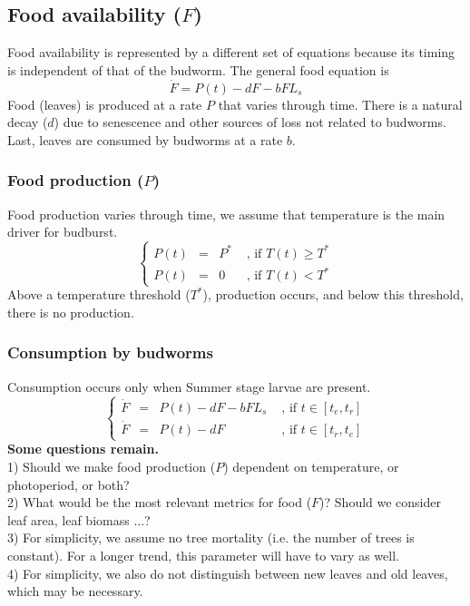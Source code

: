 \documentclass[12 pt]{article}
\begin{document}
\subsection{Food availability ($F$)}
Food availability is represented by a different set of equations because its timing is independent of that of the budworm. The general food equation is
\begin{equation}
   \Dot{F} = P(t) - dF - bFL_s
\end{equation}
Food (leaves) is produced at a rate $P$ that varies through time. There is a natural decay ($d$) due to senescence and other sources of loss not related to budworms. Last, leaves are consumed by budworms at a rate $b$. 
\subsubsection{Food production ($P$)}
Food production varies through time, we assume that temperature is the main driver for budburst.
\begin{equation}
    \left \lbrace
    \begin{array}{lcll}
        P(t) & = & P^* & \text{ , if } T(t) \geqslant T^*  \\
        P(t) & = & 0 & \text{ , if } T(t) < T^*
    \end{array} \right .
\end{equation}
Above a temperature threshold ($T^*$), production occurs, and below this threshold, there is no production. 

\subsubsection{Consumption by budworms}
Consumption occurs only when Summer stage larvae are present.
\begin{equation}
    \left \lbrace
    \begin{array}{lcll}
         \Dot{F} & = & P(t) - dF - bFL_s & \text{ , if } t \in [t_e , t_r ] \\
         \Dot{F} & = & P(t) - dF & \text{ , if } t \in [t_r , t_e]
    \end{array} \right .
\end{equation}
\textbf{Some questions remain.} \\
1) Should we make food production ($P$) dependent on temperature, or photoperiod, or both? \\
2) What would be the most relevant metrics for food ($F$)? Should we consider leaf area, leaf biomass ...? \\
3) For simplicity, we assume no tree mortality (i.e. the number of trees is constant). For a longer trend, this parameter will have to vary as well. \\
4) For simplicity, we also do not distinguish between new leaves and old leaves, which may be necessary. 
\end{document}
